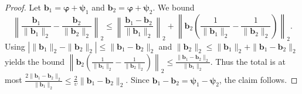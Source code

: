 \documentclass{article}
\theoremstyle{plain}
\theoremstyle{definition}
\theoremstyle{remark}
\begin{document}
	\begin{proof}
		Let $\mathbf{b}_1=\boldsymbol{\varphi}+\boldsymbol{\psi}_1$ and $\mathbf{b}_2=\boldsymbol{\varphi}+\boldsymbol{\psi}_2$.
		We bound
		\begin{equation*}
			\left\|\frac{\mathbf{b}_1}{\|\mathbf{b}_1\|_2}-\frac{\mathbf{b}_2}{\|\mathbf{b}_2\|_2}\right\|_2
			\le
			\left\|\frac{\mathbf{b}_1-\mathbf{b}_2}{\|\mathbf{b}_1\|_2}\right\|_2
			+
			\left\|\mathbf{b}_2\left(\frac{1}{\|\mathbf{b}_1\|_2}-\frac{1}{\|\mathbf{b}_2\|_2}\right)\right\|_2.
		\end{equation*}
		Using $|\|\mathbf{b}_1\|_2-\|\mathbf{b}_2\|_2|\le\|\mathbf{b}_1-\mathbf{b}_2\|_2$ and $\|\mathbf{b}_2\|_2\le\|\mathbf{b}_1\|_2+\|\mathbf{b}_1-\mathbf{b}_2\|_2$ yields the bound $\left\|\mathbf{b}_2\left(\frac{1}{\|\mathbf{b}_1\|_2}-\frac{1}{\|\mathbf{b}_2\|_2}\right)\right\|_2\le \frac{\|\mathbf{b}_1-\mathbf{b}_2\|_2}{\|\mathbf{b}_1\|_2}$.
		Thus the total is at most $\frac{2\|\mathbf{b}_1-\mathbf{b}_2\|_2}{\|\mathbf{b}_1\|_2}\le\frac{2}{\upsilon}\|\mathbf{b}_1-\mathbf{b}_2\|_2$.
		Since $\mathbf{b}_1-\mathbf{b}_2=\boldsymbol{\psi}_1-\boldsymbol{\psi}_2$, the claim follows.
	\end{proof}
\end{document}
